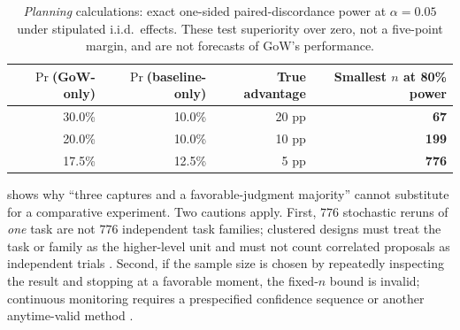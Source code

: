 \documentclass[11pt]{article}
\theoremstyle{gowthm}
\theoremstyle{gowplain}
\begin{document}
\begin{table}[t]
\centering
\caption{\emph{Planning} calculations: exact one-sided paired-discordance power
at $\alpha=0.05$ under stipulated i.i.d.\ effects. These test superiority over
zero, not a five-point margin, and are not forecasts of GoW's performance.}
\label{tab:superiority-power}
\small
\begin{tabular}{rrrr}
\toprule
$\Pr$(GoW-only) & $\Pr$(baseline-only) & True advantage & Smallest $n$ at 80\% power \\
\midrule
30.0\% & 10.0\% & 20 pp & \textbf{67} \\
20.0\% & 10.0\% & 10 pp & \textbf{199} \\
17.5\% & 12.5\% & \phantom{0}5 pp & \textbf{776} \\
\bottomrule
\end{tabular}
\end{table}

 shows why ``three captures and a favorable-judgment
majority'' cannot substitute for a comparative experiment. Two cautions apply.
First, $776$ stochastic reruns of \emph{one} task are not $776$ independent task
families; clustered designs must treat the task or family as the higher-level
unit and must not count correlated proposals as independent trials
\citep{demsar2006statistical}. Second, if the sample size is chosen by repeatedly
inspecting the result and stopping at a favorable moment, the fixed-$n$ bound is
invalid; continuous monitoring requires a prespecified confidence sequence or
another anytime-valid method \citep{howard2021timeuniform}.
\end{document}
